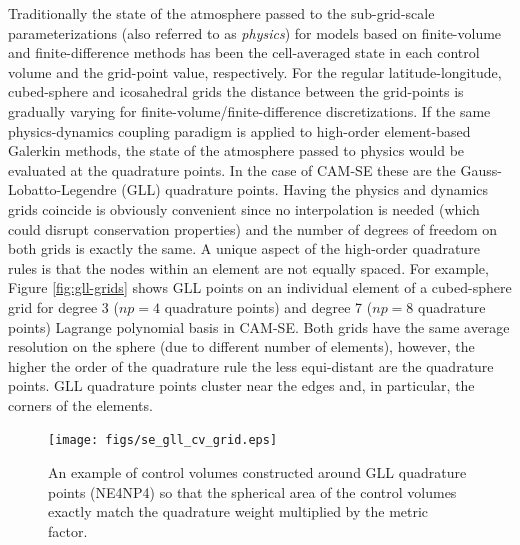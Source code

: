 \documentclass[twocol]{ametsoc}
\begin{document}
Traditionally the state of the atmosphere passed to the sub-grid-scale parameterizations (also referred to as {\em{physics}}) for models based on finite-volume and finite-difference methods has been the cell-averaged state in each control volume and the grid-point value, respectively. For the regular latitude-longitude, cubed-sphere and icosahedral grids the distance between the grid-points is gradually varying for finite-volume/finite-difference discretizations. If the same physics-dynamics coupling paradigm is applied to high-order element-based Galerkin methods, the state of the atmosphere passed to physics would be evaluated at the quadrature points. In the case of CAM-SE these are the Gauss-Lobatto-Legendre (GLL) quadrature points. Having the physics and dynamics grids coincide is obviously convenient since no interpolation is needed (which could disrupt conservation properties) and the number of degrees of freedom on both grids is exactly the same. A unique aspect of the high-order quadrature rules is that the nodes within an element are not equally spaced. For example, Figure \ref{fig:gll-grids} shows GLL points on an individual element of a cubed-sphere grid for degree 3 ($np=4$ quadrature points) and degree 7 ($np=8$ quadrature points) Lagrange polynomial basis in CAM-SE. Both grids have the same average resolution on the sphere (due to different number of elements), however, the higher the order of the quadrature rule the less equi-distant are the quadrature points. GLL quadrature points cluster near the edges and, in particular, the corners of the elements.

\begin{figure}[t]
\noindent\texttt{[image: figs/se\_gll\_cv\_grid.eps]}\\
\caption{An example of control volumes constructed around GLL quadrature points (NE4NP4) so that the spherical area of the control volumes exactly match the quadrature weight multiplied by the metric factor.}
\label{fig:cv-grids}
\end{figure}
\end{document}
